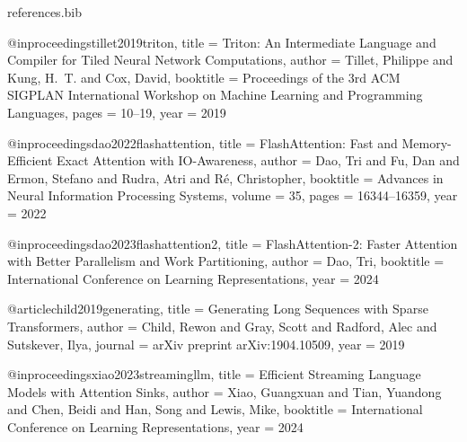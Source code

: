 \begin{filecontents}[overwrite]{references.bib}

@inproceedings{tillet2019triton,
  title     = {Triton: An Intermediate Language and Compiler for Tiled Neural Network Computations},
  author    = {Tillet, Philippe and Kung, H.~T. and Cox, David},
  booktitle = {Proceedings of the 3rd {ACM} {SIGPLAN} International Workshop on Machine Learning and Programming Languages},
  pages     = {10--19},
  year      = {2019}
}


@inproceedings{dao2022flashattention,
  title     = {{FlashAttention}: Fast and Memory-Efficient Exact Attention with {IO}-Awareness},
  author    = {Dao, Tri and Fu, Dan and Ermon, Stefano and Rudra, Atri and R{\'e}, Christopher},
  booktitle = {Advances in Neural Information Processing Systems},
  volume    = {35},
  pages     = {16344--16359},
  year      = {2022}
}

@inproceedings{dao2023flashattention2,
  title     = {{FlashAttention-2}: Faster Attention with Better Parallelism and Work Partitioning},
  author    = {Dao, Tri},
  booktitle = {International Conference on Learning Representations},
  year      = {2024}
}


@article{child2019generating,
  title   = {Generating Long Sequences with Sparse Transformers},
  author  = {Child, Rewon and Gray, Scott and Radford, Alec and Sutskever, Ilya},
  journal = {arXiv preprint arXiv:1904.10509},
  year    = {2019}
}


@inproceedings{xiao2023streamingllm,
  title     = {Efficient Streaming Language Models with Attention Sinks},
  author    = {Xiao, Guangxuan and Tian, Yuandong and Chen, Beidi and Han, Song and Lewis, Mike},
  booktitle = {International Conference on Learning Representations},
  year      = {2024}
}



\end{filecontents}
